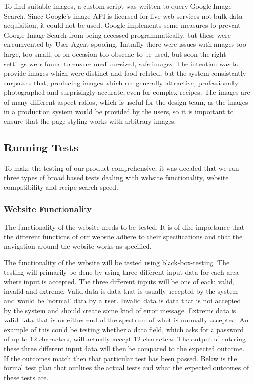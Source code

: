 To find suitable images, a custom script was written to query Google Image Search. Since Google's image API is licensed for live web services not bulk data acquisition, it could not be used. Google implements some measures to prevent Google Image Search from being accessed programmatically, but these were circumvented by User Agent spoofing. Initially there were issues with images too large, too small, or on occasion too obscene to be used, but soon the right settings were found to ensure medium-sized, safe images. The intention was to provide images which were distinct and food related, but the system consistently surpasses that, producing images which are generally attractive, professionally photographed and surprisingly accurate, even for complex recipes. The images are of many different aspect ratios, which is useful for the design team, as the images in a production system would be provided by the users, so it is important to ensure that the page styling works with arbitrary images.



\subsection{Running Tests}
To make the testing of our product comprehensive, it was decided that we run three types of broad based tests dealing with website functionality, website compatibility and recipe search speed. 

\subsubsection{Website Functionality}
The functionality of the website needs to be tested. It is of dire importance that the different functions of our website adhere to their specifications and that the navigation around the website works as specified. 

The functionality of the website will be tested using black-box-testing. The testing will primarily be done by using three different input data for each area where input is accepted. The three different inputs will be one of each: valid, invalid and extreme.
Valid data is data that is usually accepted by the system and would be 'normal' data by a user. Invalid data is data that is not accepted by the system and should create some kind of error message. Extreme data is valid data that is on either end of the spectrum of what is normally accepted. An example of this could be testing whether a data field, which asks for a password of up to 12 characters, will actually accept 12 characters. The output of entering these three different input data will then be compared to the expected outcome. If the outcomes match then that particular test has been passed. Below is the formal test plan that outlines the actual tests and what the expected outcomes of these tests are.
 
